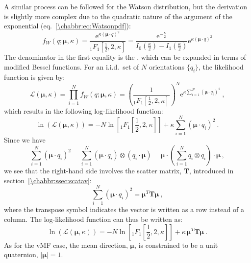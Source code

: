 A similar process can be followed for the Watson distribution, but the derivation is slightly more complex due to the quadratic nature of the argument of the exponential (eq.~\ref{\chabbr:eq:Watsonpdf}): 
\[
	f_W(q;\bm{\mu},\kappa) = \frac{\mathrm{e}^{\kappa(\bm{\mu}\cdot q)^2}}{{_1}F_1[\frac{1}{2},2,\kappa]}=\frac{\mathrm{e}^{-\frac{\kappa}{2}}}{I_0(\frac{\kappa}{2})-I_1(\frac{\kappa}{2})}\mathrm{e}^{\kappa(\bm{\mu}\cdot q)^2}
\]
The denominator in the first equality is the , which can be expanded in terms of modified Bessel functions.  For an i.i.d.\ set of $N$ orientations $\{q_i\}$, the likelihood function is given by:
\[
	\mathcal{L}(\bm{\mu},\kappa) = \prod_{i=1}^N f_W(q;\bm{\mu},\kappa) = \left(\frac{1}{{_1}F_1[\frac{1}{2},2,\kappa]}\right)^N \mathrm{e}^{\kappa\sum_{i=1}^N(\bm{\mu}\cdot q_i)^2}\ ,
\] 
which results in the following log-likelihood function:
\[
	\ln(\mathcal{L}(\bm{\mu},\kappa)) = -N\ln\left[ {_1}F_1[\frac{1}{2},2,\kappa] \right] + \kappa\sum_{i=1}^N(\bm{\mu}\cdot q_i)^2\ .
\] 
Since we have
\[
	\sum_{i=1}^N(\bm{\mu}\cdot q_i)^2 = \sum_{i=1}^N (\bm{\mu}\cdot q_i)\otimes(q_i \cdot \bm{\mu}) = \bm{\mu}\cdot \left(\sum_{i=1}^N q_i\otimes q_i\right) \cdot \bm{\mu}\ ,
\]
we see that the right-hand side involves the scatter matrix, $\mathbf{T}$, introduced in section~\ref{\chabbr:ssec:scatav}:
\[
	\sum_{i=1}^N(\bm{\mu}\cdot q_i)^2 = \bm{\mu}^T\mathbf{T}\bm{\mu}\ ,
\]
where the transpose symbol indicates the vector is written as a row instead of a column. The log-likelihood function can thus be written as:
\[
	\ln(\mathcal{L}(\bm{\mu},\kappa)) = -N\ln\left[ {_1}F_1[\frac{1}{2},2,\kappa] \right] + \kappa\,\bm{\mu}^T\mathbf{T}\bm{\mu}\ .
\] 
As for the vMF case, the mean direction, $\bm{\mu}$, is constrained to be a unit quaternion, $\vert\bm{\mu}\vert=1$.  

